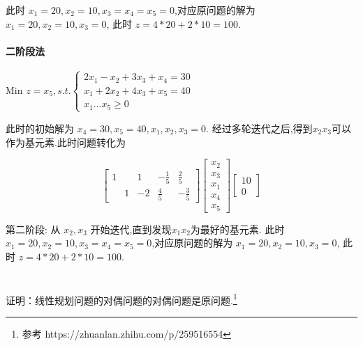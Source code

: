 \documentclass[a4paper]{article}
\begin{document}
此时 $x_1 = 20, x_2 = 10, x_3=x_4 = x_5 = 0$,对应原问题的解为 $x_1 = 20, x_2 = 10, x_3 = 0$, 此时 $z = 4 * 20 + 2 * 10 = 100$.


\paragraph{二阶段法}



Min \(z=x_5 , s.t. \left\{\begin{aligned}
  2x_1-x_2+3x_3+x_4=30 \\
  x_1+2x_2+4x_3 + x_5=40 \\
x_1  ... x_5 \geq 0
\end{aligned}\right.\)

此时的初始解为 $x_4 = 30, x_5 = 40, x_1,x_2,x_3 = 0$. 经过多轮迭代之后,得到$x_2x_3$可以作为基元素.此时问题转化为

\[
\begin{bmatrix}
1 &   & 1 & -\frac{1}{5} & \frac{2}{5}\\
  & 1 & -2 & \frac{4}{5} & -\frac{3}{5} 
\end{bmatrix}
\begin{bmatrix}
    x_2 \\ x_3 \\ x_1 \\ x_4 \\  x_5
\end{bmatrix} 
\begin{bmatrix}
    10 \\ 0
\end{bmatrix} 
\]


第二阶段: 从 $x_2,x_3$ 开始迭代,直到发现$x_1x_2$为最好的基元素. 此时 $x_1 = 20, x_2 = 10, x_3=x_4 = x_5 = 0$,对应原问题的解为 $x_1 = 20, x_2 = 10, x_3 = 0$, 此时 $z = 4 * 20 + 2 * 10 = 100$.
\section{}

证明：线性规划问题的对偶问题的对偶问题是原问题.\footnote{参考 https://zhuanlan.zhihu.com/p/259516554}
\end{document}
